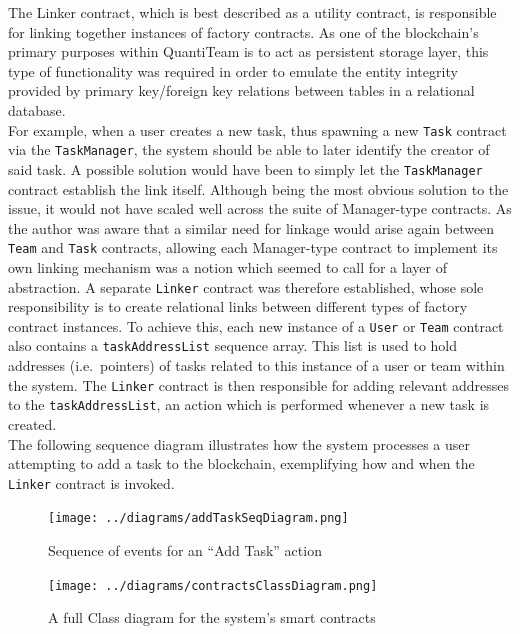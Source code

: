 \documentclass[12pt]{report}
\begin{document}
The Linker contract, which is best described as a utility contract, is
responsible for linking together instances of factory contracts. As one
of the blockchain's primary purposes within QuantiTeam is to act as
persistent storage layer, this type of functionality was required in
order to emulate the entity integrity provided by primary key/foreign
key relations between tables in a relational
database\cite{1primarykeyforeignkey}.\\
For example, when a user creates a new task, thus spawning a new
\texttt{Task} contract via the \texttt{TaskManager}, the system should
be able to later identify the creator of said task. A possible solution
would have been to simply let the \texttt{TaskManager} contract
establish the link itself. Although being the most obvious solution to
the issue, it would not have scaled well across the suite of
Manager-type contracts. As the author was aware that a similar need for
linkage would arise again between \texttt{Team} and \texttt{Task}
contracts, allowing each Manager-type contract to implement its own
linking mechanism was a notion which seemed to call for a layer of
abstraction. A separate \texttt{Linker} contract was therefore
established, whose sole responsibility is to create relational links
between different types of factory contract instances. To achieve this,
each new instance of a \texttt{User} or \texttt{Team} contract also
contains a \texttt{taskAddressList} sequence array. This list is used to
hold addresses (i.e.~pointers) of tasks related to this instance of a
user or team within the system. The \texttt{Linker} contract is then
responsible for adding relevant addresses to the
\texttt{taskAddressList}, an action which is performed whenever a new
task is created.\\
The following sequence diagram illustrates how the system processes a
user attempting to add a task to the blockchain, exemplifying how and
when the \texttt{Linker} contract is invoked.

\begin{figure}[htbp]
\centering
\texttt{[image: ../diagrams/addTaskSeqDiagram.png]}
\caption{Sequence of events for an ``Add Task'' action}
\end{figure}

\begin{figure}[htbp]
\centering
\texttt{[image: ../diagrams/contractsClassDiagram.png]}
\caption{A full Class diagram for the system's smart contracts}
\end{figure}
\end{document}
